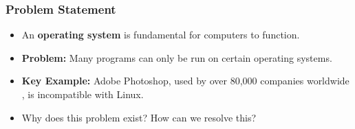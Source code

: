 \begin{frame}
\frametitle{Problem Statement}
\begin{theorembox}
\begin{itemize}
    \setlength{\itemsep}{8pt}
    \item An \textbf{operating system} is fundamental for computers to function.
    \item \textbf{Problem:} Many programs can only be run on certain operating systems.
    \item \textbf{Key Example:} Adobe Photoshop, used by over 80,000 companies worldwide \cite{adobe-stats}, is incompatible with Linux.
    \item Why does this problem exist? How can we resolve this? 
\end{itemize}
\end{theorembox}

\end{frame}